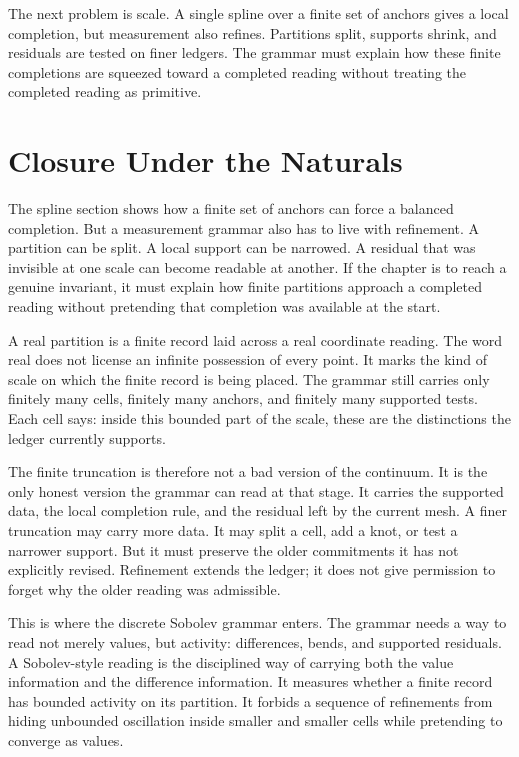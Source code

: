 The next problem is scale. A single spline over a finite set of anchors
gives a local completion, but measurement also refines. Partitions split,
supports shrink, and residuals are tested on finer ledgers. The grammar
must explain how these finite completions are squeezed toward a completed
reading without treating the completed reading as primitive.

\section{Closure Under the Naturals}

The spline section shows how a finite set of anchors can force a balanced
completion. But a measurement grammar also has to live with refinement. A
partition can be split. A local support can be narrowed. A residual that was
invisible at one scale can become readable at another. If the chapter is to
reach a genuine invariant, it must explain how finite partitions approach a
completed reading without pretending that completion was available at the
start.

A real partition is a finite record laid across a real coordinate reading.
The word real does not license an infinite possession of every point. It
marks the kind of scale on which the finite record is being placed. The
grammar still carries only finitely many cells, finitely many anchors, and
finitely many supported tests. Each cell says: inside this bounded part of
the scale, these are the distinctions the ledger currently supports.

The finite truncation is therefore not a bad version of the continuum. It
is the only honest version the grammar can read at that stage. It carries
the supported data, the local completion rule, and the residual left by the
current mesh. A finer truncation may carry more data. It may split a cell,
add a knot, or test a narrower support. But it must preserve the older
commitments it has not explicitly revised. Refinement extends the ledger; it
does not give permission to forget why the older reading was admissible.

This is where the discrete Sobolev grammar enters. The grammar needs a way
to read not merely values, but activity: differences, bends, and supported
residuals. A Sobolev-style reading is the disciplined way of carrying both
the value information and the difference information. It measures whether a
finite record has bounded activity on its partition. It forbids a sequence
of refinements from hiding unbounded oscillation inside smaller and smaller
cells while pretending to converge as values.

